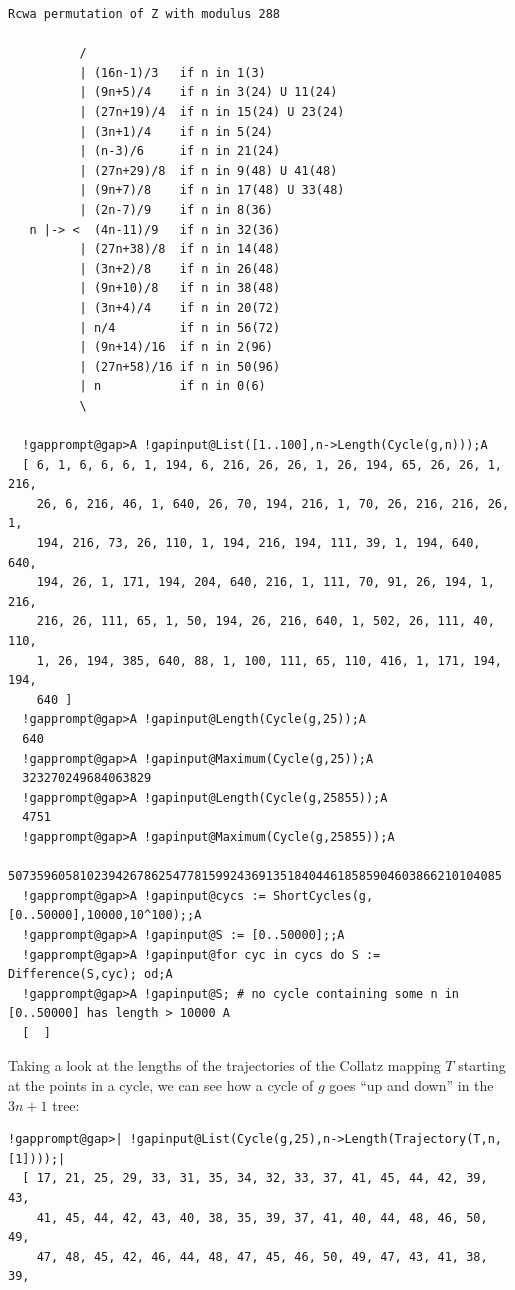 \documentclass[a4paper,11pt]{report}
\begin{document}
{{\begin{Verbatim}[commandchars=!@A,fontsize=\small,frame=single,label=Example]
  Rcwa permutation of Z with modulus 288
  
          /
          | (16n-1)/3   if n in 1(3)
          | (9n+5)/4    if n in 3(24) U 11(24)
          | (27n+19)/4  if n in 15(24) U 23(24)
          | (3n+1)/4    if n in 5(24)
          | (n-3)/6     if n in 21(24)
          | (27n+29)/8  if n in 9(48) U 41(48)
          | (9n+7)/8    if n in 17(48) U 33(48)
          | (2n-7)/9    if n in 8(36)
   n |-> <  (4n-11)/9   if n in 32(36)
          | (27n+38)/8  if n in 14(48)
          | (3n+2)/8    if n in 26(48)
          | (9n+10)/8   if n in 38(48)
          | (3n+4)/4    if n in 20(72)
          | n/4         if n in 56(72)
          | (9n+14)/16  if n in 2(96)
          | (27n+58)/16 if n in 50(96)
          | n           if n in 0(6)
          \
  
  !gapprompt@gap>A !gapinput@List([1..100],n->Length(Cycle(g,n)));A
  [ 6, 1, 6, 6, 6, 1, 194, 6, 216, 26, 26, 1, 26, 194, 65, 26, 26, 1, 216, 
    26, 6, 216, 46, 1, 640, 26, 70, 194, 216, 1, 70, 26, 216, 216, 26, 1, 
    194, 216, 73, 26, 110, 1, 194, 216, 194, 111, 39, 1, 194, 640, 640, 
    194, 26, 1, 171, 194, 204, 640, 216, 1, 111, 70, 91, 26, 194, 1, 216, 
    216, 26, 111, 65, 1, 50, 194, 26, 216, 640, 1, 502, 26, 111, 40, 110, 
    1, 26, 194, 385, 640, 88, 1, 100, 111, 65, 110, 416, 1, 171, 194, 194, 
    640 ]
  !gapprompt@gap>A !gapinput@Length(Cycle(g,25));A
  640
  !gapprompt@gap>A !gapinput@Maximum(Cycle(g,25));A
  323270249684063829
  !gapprompt@gap>A !gapinput@Length(Cycle(g,25855));A
  4751
  !gapprompt@gap>A !gapinput@Maximum(Cycle(g,25855));A
  507359605810239426786254778159924369135184044618585904603866210104085
  !gapprompt@gap>A !gapinput@cycs := ShortCycles(g,[0..50000],10000,10^100);;A
  !gapprompt@gap>A !gapinput@S := [0..50000];;A
  !gapprompt@gap>A !gapinput@for cyc in cycs do S := Difference(S,cyc); od;A
  !gapprompt@gap>A !gapinput@S; # no cycle containing some n in [0..50000] has length > 10000 A
  [  ]
\end{Verbatim}
 Taking a look at the lengths of the trajectories of the Collatz mapping $T$ starting at the points in a cycle, we can see how a cycle of $g$ goes ``up and down'' in the $3n+1$ tree: 
\begin{Verbatim}[commandchars=!@|,fontsize=\small,frame=single,label=Example]
  !gapprompt@gap>| !gapinput@List(Cycle(g,25),n->Length(Trajectory(T,n,[1])));|
  [ 17, 21, 25, 29, 33, 31, 35, 34, 32, 33, 37, 41, 45, 44, 42, 39, 43, 
    41, 45, 44, 42, 43, 40, 38, 35, 39, 37, 41, 40, 44, 48, 46, 50, 49, 
    47, 48, 45, 42, 46, 44, 48, 47, 45, 46, 50, 49, 47, 43, 41, 38, 39, 

\end{Verbatim}}}
\end{document}
